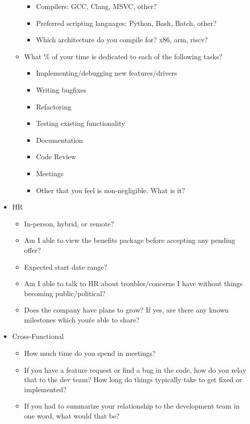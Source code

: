 \documentclass{article}
\begin{document}
\begin{itemize}
\begin{itemize}
\begin{itemize}
          \item Compilers: GCC, Clang, MSVC, other?
          \item Preferred scripting languages: Python, Bash, Batch, other?
          \item Which architecture do you compile for? x86, arm, riscv?
        \end{itemize}
      \item What \% of your time is dedicated to each of the following tasks?
        \begin{itemize}
          \item Implementing/debugging new features/drivers
          \item Writing bugfixes
          \item Refactoring
          \item Testing existing functionality
          \item Documentation
          \item Code Review
          \item Meetings
          \item Other that you feel is non-negligible. What is it?
        \end{itemize}
    \end{itemize}
  \item HR
    \begin{itemize}
      \item In-person, hybrid, or remote?
      \item Am I able to view the benefits package before accepting any pending offer?
      \item Expected start date range?
      \item Am I able to talk to HR about troubles/concerns I have without things becoming public/political?
      \item Does the company have plans to grow? If yes, are there any known milestones which you\'re able to share?
    \end{itemize}
  \item Cross-Functional
    \begin{itemize}
      \item How much time do you spend in meetings?
      \item If you have a feature request or find a bug in the code, how do you relay that to the dev team? How long do things typically take to get fixed or implemented?
      \item If you had to summarize your relationship to the development team in one word, what would that be?

\end{itemize}
\end{itemize}
\end{document}
